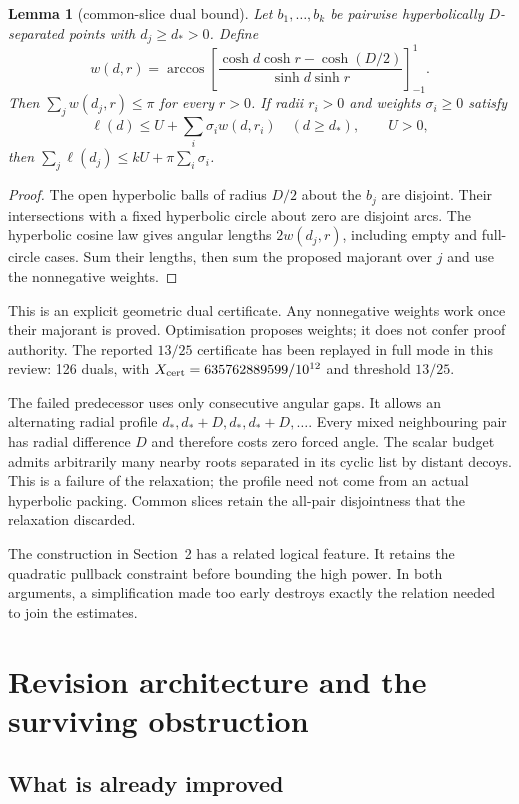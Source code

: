 \documentclass[11pt,a4paper]{article}
\newtheorem{lemma}[theorem]{Lemma}
\theoremstyle{remark}\newtheorem{remark}[theorem]{Remark}
\newcommand{\clip}[1]{\left[#1\right]_{-1}^{1}}
\begin{document}
\begin{lemma}[common-slice dual bound]\label{lem:slice}
Let $b_1,\ldots,b_k$ be pairwise hyperbolically $D$-separated points with
$d_j\ge d_*>0$. Define
\[
 w(d,r)=\arccos\clip{\frac{\cosh d\cosh r-\cosh(D/2)}
                              {\sinh d\sinh r}}.
\]
Then $\sum_jw(d_j,r)\le\pi$ for every $r>0$. If radii $r_i>0$ and
weights $\sigma_i\ge0$ satisfy
\[
 \ell(d)\le U+\sum_i\sigma_iw(d,r_i)\quad(d\ge d_*),
 \qquad U>0,
\]
then $\sum_j\ell(d_j)\le kU+\pi\sum_i\sigma_i$.
\end{lemma}
\begin{proof}
The open hyperbolic balls of radius $D/2$ about the $b_j$ are disjoint.
Their intersections with a fixed hyperbolic circle about zero are disjoint
arcs. The hyperbolic cosine law gives angular lengths $2w(d_j,r)$, including
empty and full-circle cases. Sum their lengths, then sum the proposed
majorant over $j$ and use the nonnegative weights.
\end{proof}

This is an explicit geometric dual certificate. Any nonnegative weights
work once their majorant is proved. Optimisation proposes weights; it does
not confer proof authority. The reported $13/25$ certificate has been
replayed in full mode in this review: 126 duals, with
$X_{\rm cert}=635762889599/10^{12}$ and threshold $13/25$.

The failed predecessor uses only consecutive angular gaps. It allows an
alternating radial profile $d_*,d_*+D,d_*,d_*+D,\ldots$.
Every mixed neighbouring pair has radial difference $D$ and therefore costs
zero forced angle. The scalar budget admits arbitrarily many nearby roots
separated in its cyclic list by distant decoys. This is a failure of the
relaxation; the profile need not come from an actual hyperbolic packing.
Common slices retain the all-pair disjointness that the relaxation discarded.

The construction in Section~2 has a related logical feature. It retains the
quadratic pullback constraint before bounding the high power. In both
arguments, a simplification made too early destroys exactly the relation
needed to join the estimates.

\section{Revision architecture and the surviving obstruction}

\subsection{What is already improved}
\end{document}
